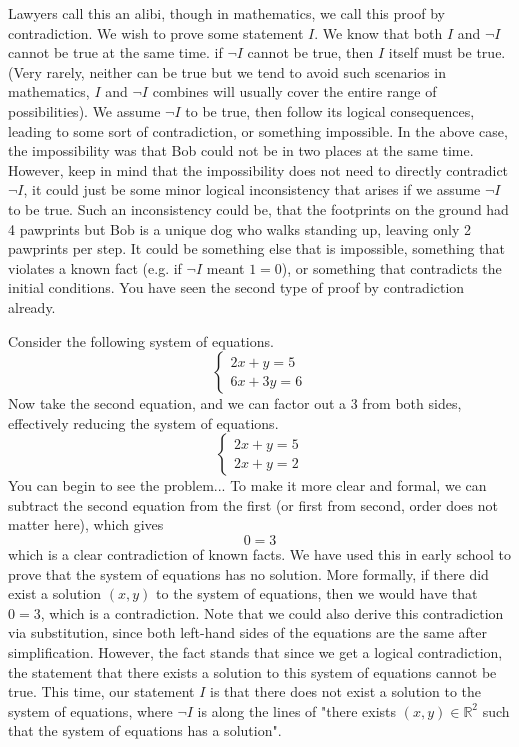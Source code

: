 Lawyers call this an alibi, though in mathematics, we call this proof by contradiction. We wish to prove some statement $I$. We know that both $I$ and $\neg I$ cannot be true at the same time. if $\neg I$ cannot be true, then $I$ itself must be true. (Very rarely, neither can be true but we tend to avoid such scenarios in mathematics, $I$ and $\neg I$ combines will usually cover the entire range of possibilities). We assume $\neg I$ to be true, then follow its logical consequences, leading to some sort of contradiction, or something impossible. In the above case, the impossibility was that Bob could not be in two places at the same time. However, keep in mind that the impossibility does not need to directly contradict $\neg I$, it could just be some minor logical inconsistency that arises if we assume $\neg I$ to be true. Such an inconsistency could be, that the footprints on the ground had 4 pawprints but Bob is a unique dog who walks standing up, leaving only 2 pawprints per step. It could be something else that is impossible, something that violates a known fact (e.g. if $\neg I$ meant $1=0$), or something that contradicts the initial conditions. You have seen the second type of proof by contradiction already. 

Consider the following system of equations.
\[
\begin{cases}
2x+y=5 \\
6x+3y=6
\end{cases}
\]
Now take the second equation, and we can factor out a 3 from both sides, effectively reducing the system of equations.
\[
\begin{cases}
2x+y=5 \\
2x+y=2
\end{cases}
\]
You can begin to see the problem...
To make it more clear and formal, we can subtract the second equation from the first (or first from second, order does not matter here), which gives
\[
0 = 3
\]
which is a clear contradiction of known facts. We have used this in early school to prove that the system of equations has no solution. More formally, if there did exist a solution $(x, y)$ to the system of equations, then we would have that $0 = 3$, which is a contradiction. Note that we could also derive this contradiction via substitution, since both left-hand sides of the equations are the same after simplification. However, the fact stands that since we get a logical contradiction, the statement that there exists a solution to this system of equations cannot be true. This time, our statement $I$ is that there does not exist a solution to the system of equations, where $\neg I$ is along the lines of "there exists $(x, y) \in \mathbb{R}^2$ such that the system of equations has a solution". 

